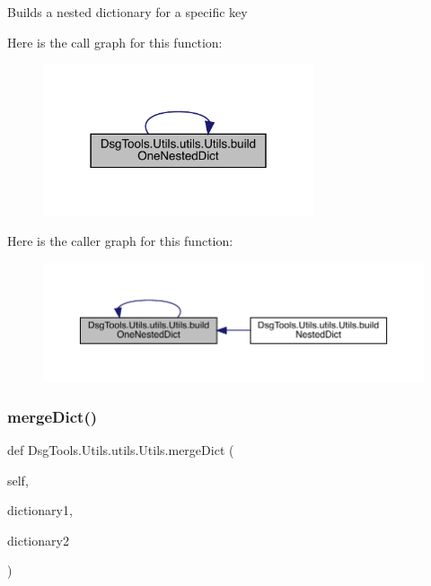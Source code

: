 \begin{DoxyVerb}Builds a nested dictionary for a specific key
\end{DoxyVerb}
 Here is the call graph for this function\+:
\nopagebreak
\begin{figure}[H]
\begin{center}
\leavevmode
\includegraphics[width=226pt]{class_dsg_tools_1_1_utils_1_1utils_1_1_utils_a02133bd06c1d3fcd6319e7a59256d7e3_cgraph}
\end{center}
\end{figure}
Here is the caller graph for this function\+:
\nopagebreak
\begin{figure}[H]
\begin{center}
\leavevmode
\includegraphics[width=350pt]{class_dsg_tools_1_1_utils_1_1utils_1_1_utils_a02133bd06c1d3fcd6319e7a59256d7e3_icgraph}
\end{center}
\end{figure}
\mbox{\label{class_dsg_tools_1_1_utils_1_1utils_1_1_utils_ab57951edce702c5640e2ded9c4671c1e}} 
\subsubsection{\texorpdfstring{merge\+Dict()}{mergeDict()}}
{\footnotesize\ttfamily def Dsg\+Tools.\+Utils.\+utils.\+Utils.\+merge\+Dict (\begin{DoxyParamCaption}\item[{}]{self,  }\item[{}]{dictionary1,  }\item[{}]{dictionary2 }\end{DoxyParamCaption})}


